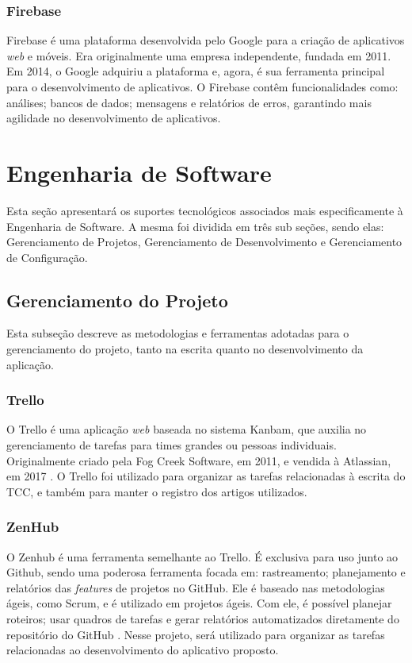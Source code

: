 \subsubsection{Firebase}

Firebase é uma plataforma desenvolvida pelo Google para a criação de aplicativos 
\emph{web} e móveis. Era originalmente uma empresa independente, fundada em 2011. 
Em 2014, o Google adquiriu a plataforma e, agora, é sua ferramenta principal 
para o desenvolvimento de aplicativos. O Firebase contêm funcionalidades como: 
análises; bancos de dados; mensagens e relatórios de erros, garantindo mais agilidade no desenvolvimento de aplicativos\cite{firebase2011}.

\section{Engenharia de Software}

Esta seção apresentará os suportes tecnológicos associados mais especificamente 
à Engenharia de Software. A mesma foi dividida em três sub seções, sendo elas: 
Gerenciamento de Projetos, Gerenciamento de Desenvolvimento e Gerenciamento de 
Configuração.

\subsection{Gerenciamento do Projeto}

Esta subseção descreve as metodologias e ferramentas adotadas para o gerenciamento 
do projeto, tanto na escrita quanto no desenvolvimento da aplicação.

\subsubsection{Trello}

O Trello é uma aplicação \emph{web} baseada no sistema Kanbam, que auxilia no 
gerenciamento de tarefas para times grandes ou pessoas individuais. 
Originalmente criado pela Fog Creek Software, em 2011, e vendida à Atlassian, em 
2017 \cite{trello2011}. O Trello foi utilizado para organizar as tarefas 
relacionadas à escrita do TCC, e também para manter o registro dos artigos utilizados.

\subsubsection{ZenHub}

O Zenhub é uma ferramenta semelhante ao Trello. É exclusiva para uso junto ao 
Github, sendo uma poderosa ferramenta focada em: rastreamento; planejamento e 
relatórios das \emph{features} de projetos no GitHub. Ele é baseado nas 
metodologias ágeis, como Scrum, e é utilizado em projetos ágeis. Com ele, 
é possível planejar roteiros; usar quadros de tarefas e gerar relatórios 
automatizados diretamente do repositório do GitHub \cite{zenhub2020}. 
Nesse projeto, será utilizado para organizar as tarefas relacionadas ao 
desenvolvimento do aplicativo proposto.


